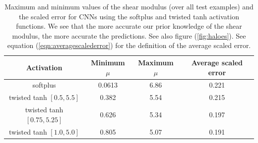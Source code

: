 \documentclass[12pt]{article}
\newcommand{\ra}[1]{\renewcommand{\arraystretch}{#1}}
\begin{document}
\begin{table}
  \ra{1.3}
  \centering
  \begin{tabular}{cccc}
    \toprule
    {Activation}  & {Minimum $\mu$} & {Maximum $\mu$} & {Average scaled error}\\
    \midrule
    softplus                     &    0.0613    &  6.86       &  0.221 \\
    twisted tanh $[0.5, 5.5]$    &    0.382     &  5.54       & 0.215  \\     
    twisted tanh $[0.75,5.25]$   &    0.626     &  5.34       & 0.197  \\
    twisted tanh $[1.0, 5.0]$    &    0.805     &  5.07       & 0.191\\
    \bottomrule
  \end{tabular}
  \caption{\label{table:muminmax} Maximum and minimum values of the shear modulus (over all test examples) and the scaled error for CNNs using the softplus and twisted tanh activation functions. We see that the more accurate our prior knowledge of the shear modulus, the more accurate the predictions. See also figure (\ref{fig:haloes}). See equation (\ref{eqn:averagescalederror}) for the definition of the average scaled error.}
\end{table}
\end{document}
